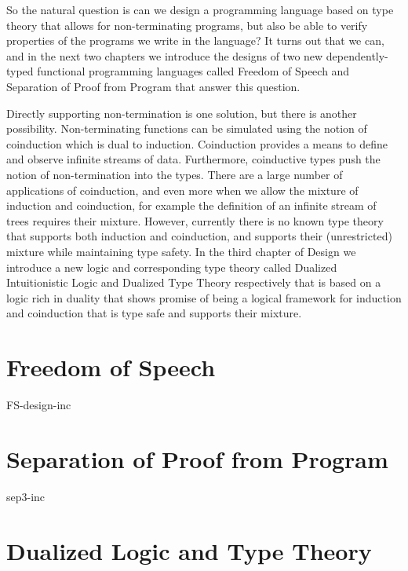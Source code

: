 \documentclass[phd,appendix,dedicationpage,ackpage,epigraphpage]{uithesis}
\begin{document}
So the natural question is can we design a programming language based
on type theory that allows for non-terminating programs, but also be
able to verify properties of the programs we write in the language?
It turns out that we can, and in the next two chapters we introduce
the designs of two new dependently-typed functional programming
languages called Freedom of Speech and Separation of Proof from
Program that answer this question.

Directly supporting non-termination is one solution, but there is
another possibility.  Non-terminating functions can be simulated using
the notion of coinduction which is dual to induction.  Coinduction
provides a means to define and observe infinite streams of data.
Furthermore, coinductive types push the notion of non-termination into
the types. There are a large number of applications of coinduction,
and even more when we allow the mixture of induction and coinduction,
for example the definition of an infinite stream of trees requires
their mixture.  However, currently there is no known type theory that
supports both induction and coinduction, and supports their
(unrestricted) mixture while maintaining type safety.  In the third
chapter of Design we introduce a new logic and corresponding type
theory called Dualized Intuitionistic Logic and Dualized Type Theory
respectively that is based on a logic rich in duality that shows
promise of being a logical framework for induction and coinduction
that is type safe and supports their mixture.

\chapter{Freedom of Speech}
\label{chap:freedom_of_speech}
{FS-design-inc}

\chapter{Separation of Proof from Program}
\label{chap:separation_of_proof_from_program}
{sep3-inc}

\chapter{Dualized Logic and Type Theory}
\label{chap:dualized_type_theory}

\end{document}
